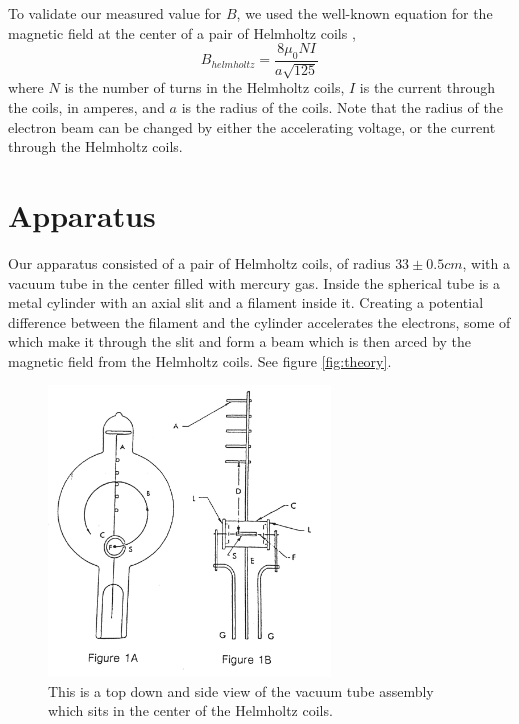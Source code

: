 \documentclass[aps,twocolumn,secnumarabic,amsmath,amssymb,nofootinbib]{revtex4-1}
\begin{document}
To validate our measured value for $B$, we used the well-known equation for the magnetic field at the center of a pair of Helmholtz coils \cite{BHelmholtz}, \cite{detailed_b_helmholtz}
\begin{equation}
	B_{helmholtz} = \frac{8\mu_0NI}{a\sqrt{125}}
\label{eq:b_helmholtz}
\end{equation}
where $N$ is the number of turns in the Helmholtz coils, $I$ is the current through the coils, in amperes, and $a$ is the radius of the coils. Note that the radius of the electron beam can be changed by either the accelerating voltage, or the current through the Helmholtz coils.

\section{Apparatus}

Our apparatus consisted of a pair of Helmholtz coils, of radius $33 \pm 0.5cm$, with a vacuum tube in the center filled with mercury gas. Inside the spherical tube is a metal cylinder with an axial slit and a filament inside it. Creating a potential difference between the filament and the cylinder accelerates the electrons, some of which make it through the slit and form a beam which is then arced by the magnetic field from the Helmholtz coils. See figure \ref{fig:theory}. \\

\begin{figure}[htb]
\includegraphics[width=7.5cm]{../images/e_over_m_apparatus.png}
\caption{This is a top down and side view of the vacuum tube assembly which sits in the center of the Helmholtz coils.}
\label{fig:apparatus}
\end{figure}
\end{document}
